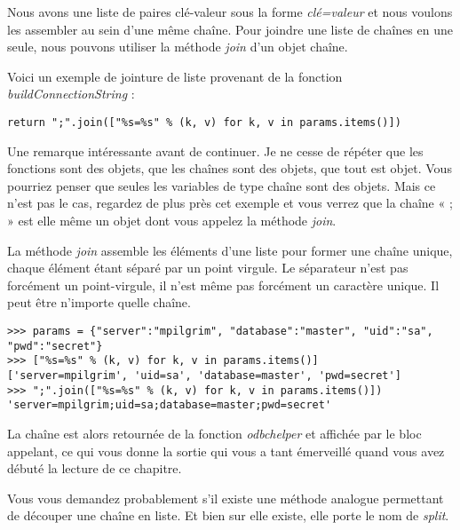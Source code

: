 Nous avons une liste de paires clé-valeur sous la forme \emph{clé=valeur} et nous voulons les assembler au sein d'une même chaîne. Pour joindre une liste de chaînes en une seule, nous pouvons utiliser la méthode \emph{join} d'un objet chaîne.

Voici un exemple de jointure de liste provenant de la fonction \emph{buildConnectionString} :

\begin{lstlisting}
return ";".join(["%s=%s" % (k, v) for k, v in params.items()])
\end{lstlisting}

Une remarque intéressante avant de continuer. Je ne cesse de répéter que les fonctions sont des objets, que les chaînes sont des objets, que tout est objet. Vous pourriez penser que seules les variables de type chaîne sont des objets.
Mais ce n'est pas le cas, regardez de plus près cet exemple et vous verrez que la chaîne « ; » est elle même un objet dont vous appelez la méthode \emph{join}.

La méthode \emph{join} assemble les éléments d'une liste pour former une chaîne unique, chaque élément étant séparé par un point virgule. Le séparateur n'est pas forcément un point-virgule, il n'est même pas forcément un caractère
unique. Il peut être n'importe quelle chaîne.


\begin{example}
\begin{lstlisting}
>>> params = {"server":"mpilgrim", "database":"master", "uid":"sa", "pwd":"secret"}
>>> ["%s=%s" % (k, v) for k, v in params.items()]
['server=mpilgrim', 'uid=sa', 'database=master', 'pwd=secret']
>>> ";".join(["%s=%s" % (k, v) for k, v in params.items()])
'server=mpilgrim;uid=sa;database=master;pwd=secret'
\end{lstlisting}
\end{example}

La chaîne est alors retournée de la fonction \emph{odbchelper} et affichée par le bloc appelant, ce qui vous donne la sortie qui vous a tant émerveillé quand vous avez débuté la lecture de ce chapitre.

Vous vous demandez probablement s'il existe une méthode analogue permettant de découper une chaîne en liste. Et bien sur elle existe, elle porte le nom de \emph{split}.

